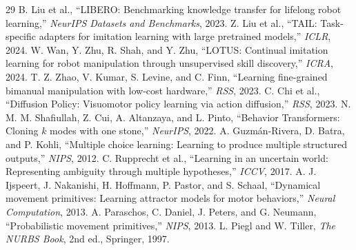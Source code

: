 \documentclass[10pt,twocolumn]{article}
\begin{document}
{\begin{thebibliography}{29}
 B. Liu et al., ``LIBERO: Benchmarking knowledge transfer for lifelong robot learning,'' \textit{NeurIPS Datasets and Benchmarks}, 2023.
 Z. Liu et al., ``TAIL: Task-specific adapters for imitation learning with large pretrained models,'' \textit{ICLR}, 2024.
 W. Wan, Y. Zhu, R. Shah, and Y. Zhu, ``LOTUS: Continual imitation learning for robot manipulation through unsupervised skill discovery,'' \textit{ICRA}, 2024.
 T. Z. Zhao, V. Kumar, S. Levine, and C. Finn, ``Learning fine-grained bimanual manipulation with low-cost hardware,'' \textit{RSS}, 2023.
 C. Chi et al., ``Diffusion Policy: Visuomotor policy learning via action diffusion,'' \textit{RSS}, 2023.
 N. M. M. Shafiullah, Z. Cui, A. Altanzaya, and L. Pinto, ``Behavior Transformers: Cloning $k$ modes with one stone,'' \textit{NeurIPS}, 2022.
 A. Guzm\'{a}n-Rivera, D. Batra, and P. Kohli, ``Multiple choice learning: Learning to produce multiple structured outputs,'' \textit{NIPS}, 2012.
 C. Rupprecht et al., ``Learning in an uncertain world: Representing ambiguity through multiple hypotheses,'' \textit{ICCV}, 2017.
 A. J. Ijspeert, J. Nakanishi, H. Hoffmann, P. Pastor, and S. Schaal, ``Dynamical movement primitives: Learning attractor models for motor behaviors,'' \textit{Neural Computation}, 2013.
 A. Paraschos, C. Daniel, J. Peters, and G. Neumann, ``Probabilistic movement primitives,'' \textit{NIPS}, 2013.
 L. Piegl and W. Tiller, \textit{The NURBS Book}, 2nd ed., Springer, 1997.
\end{thebibliography}
}
\end{document}
